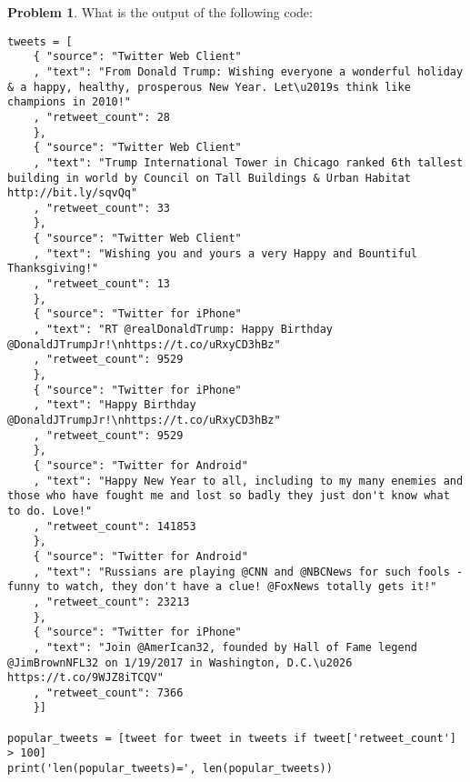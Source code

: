 \documentclass[10pt]{article}
\theoremstyle{definition}
\newtheorem{problem}{Problem}
\begin{document}
\newpage
\begin{problem}
    What is the output of the following code:
\end{problem}
\begin{lstlisting}
tweets = [
    { "source": "Twitter Web Client"
    , "text": "From Donald Trump: Wishing everyone a wonderful holiday & a happy, healthy, prosperous New Year. Let\u2019s think like champions in 2010!"
    , "retweet_count": 28
    }, 
    { "source": "Twitter Web Client"
    , "text": "Trump International Tower in Chicago ranked 6th tallest building in world by Council on Tall Buildings & Urban Habitat http://bit.ly/sqvQq"
    , "retweet_count": 33
    },
    { "source": "Twitter Web Client"
    , "text": "Wishing you and yours a very Happy and Bountiful Thanksgiving!"
    , "retweet_count": 13
    },
    { "source": "Twitter for iPhone"
    , "text": "RT @realDonaldTrump: Happy Birthday @DonaldJTrumpJr!\nhttps://t.co/uRxyCD3hBz"
    , "retweet_count": 9529
    },
    { "source": "Twitter for iPhone"
    , "text": "Happy Birthday @DonaldJTrumpJr!\nhttps://t.co/uRxyCD3hBz"
    , "retweet_count": 9529
    },
    { "source": "Twitter for Android"
    , "text": "Happy New Year to all, including to my many enemies and those who have fought me and lost so badly they just don't know what to do. Love!"
    , "retweet_count": 141853
    },
    { "source": "Twitter for Android"
    , "text": "Russians are playing @CNN and @NBCNews for such fools - funny to watch, they don't have a clue! @FoxNews totally gets it!"
    , "retweet_count": 23213
    },
    { "source": "Twitter for iPhone"
    , "text": "Join @AmerIcan32, founded by Hall of Fame legend @JimBrownNFL32 on 1/19/2017 in Washington, D.C.\u2026 https://t.co/9WJZ8iTCQV"
    , "retweet_count": 7366
    }]

popular_tweets = [tweet for tweet in tweets if tweet['retweet_count'] > 100]
print('len(popular_tweets)=', len(popular_tweets))
\end{lstlisting}
\vspace{1.5in}
\end{document}
